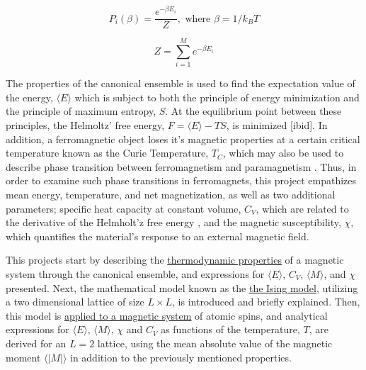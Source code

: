 \documentclass[%
oneside,                 %
final,                   %
10pt]{article}
\begin{document}
\begin{equation}
P_i(\beta)=\frac{e^{-\beta E_i}}{Z}, \text{ where }\beta=1/k_BT 
\label{eq:Boltzdist}
\end{equation}

\begin{equation}
Z=\sum_{i=1}^M e^{-\beta E_i}
\label{eq:partitionfunction}
\end{equation}

The properties of the canonical ensemble is used to find the expectation value of the energy, $\langle E \rangle$ which is subject to both the principle of energy minimization and the principle of maximum entropy, $S$. At the equilibrium point between these principles, the Helmoltz' free energy, $F=\langle E \rangle-TS$, is minimized [ibid]. In addition, a ferromagnetic object loses it's magnetic properties at a certain critical temperature known as the Curie Temperature, $T_C$, which may also be used to describe phase transition between ferromagnetism and paramagnetism \cite{FeynmanFM}. Thus, in order to examine such phase transitions in ferromagnets, this project empathizes mean energy, temperature, and net magnetization, as well as two additional parameters; specific heat capacity at constant volume, $C_V$, which are related to the derivative of the Helmholt'z free energy \cite{HJ-SP}, and the magnetic susceptibility, $\chi$, which quantifies the material's response to an external magnetic field. \newline


This projects start by describing the \hyperref[SS:thermodynamic.properties]{thermodynamic properties} of a magnetic system through the canonical ensemble, and expressions for $\langle E \rangle $, $C_V$, $\langle M \rangle $, and $\chi$ presented. Next, the mathematical model known as the \hyperref[SS:Ising]{the Ising model}, utilizing a two dimensional lattice of size $L \times L$, is introduced and briefly explained. Then, this model is \hyperref[SS:M.Model_application]{applied to a magnetic system} of atomic spins, and analytical expressions for $\langle E \rangle$, $\langle M \rangle$, $\chi$ and $C_V$ as functions of the temperature, $T$, are derived for an $L=2$ lattice, using the mean absolute value of the magnetic moment  $\langle |M| \rangle$ in addition to the previously mentioned properties.  \newline
\end{document}
